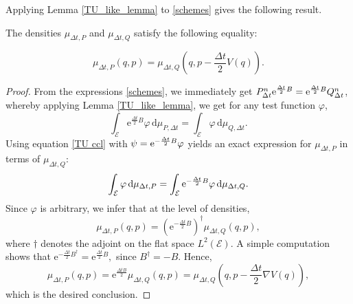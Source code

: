Applying Lemma \ref{TU_like_lemma} to \eqref{schemes} gives the following result.
\begin{prop}\label{prop:mup_expression}
  The densities $\mu_{\Delta t,P}$ and $\mu_{\Delta t,Q}$ satisfy the following equality:

  \begin{equation}
    \label{mu P expression}
    \mu_{\Delta t,P}(q,p) = \mu_{\Delta t,Q}\left(q,p-\frac{\Delta t}2V(q)\right).
  \end{equation}
\end{prop}
\begin{proof}
  From the expressions \eqref{schemes}, we immediately get $P_{\Delta t}^n\mathrm{e}^{\frac{\Delta t}2B}=\mathrm{e}^{\frac{\Delta t}2B}Q_{\Delta t}^n$,
whereby applying Lemma \ref{TU_like_lemma}, we get for any test function $\varphi$,
\begin{equation}
  \label{TU ccl}
  \int_{\mathcal E}\mathrm e^{\frac{\Delta t}2B}\varphi\, \mathrm{d}\mu_{P,\Delta t}=\int_{\mathcal E}\varphi\, \mathrm{d}\mu_{Q,\Delta t}.
\end{equation}
Using equation \eqref{TU ccl} with $\psi=\mathrm{e}^{-\frac{\Delta t}2B}\varphi$ yields an exact expression for $\mu_{\Delta t,P}$ in terms of $\mu_{\Delta t,Q}$:
\begin{equation}
  \label{pi P expression}
  \int_{\mathcal E}\varphi\, \mathrm{d}\mu_{\Delta t,P} = \int_{\mathcal E}\mathrm{e}^{-\frac{\Delta t}2B}\varphi\, \mathrm{d}\mu_{\Delta t,Q}.
\end{equation}
Since $\varphi$ is arbitrary, we infer that at the level of densities,
\begin{equation}
  \mu_{\Delta t,P}(q,p)=\left(\mathrm{e}^{-\frac{\Delta t}2B}\right)^\dagger\mu_{\Delta t,Q}(q,p),
\end{equation}
where $\dagger$ denotes the adjoint on the flat space $L^2(\mathcal E)$. A simple computation shows that 
$\mathrm e^{-\frac{\Delta t}2 B^\dagger}=\mathrm{e}^{\frac{\Delta t}2B},$
since $B^\dagger=-B$.
Hence,
\begin{equation}\label{prop1 ccl}
  \mu_{\Delta t,P}(q,p) = \mathrm{e}^{\frac{\Delta t B}2}\mu_{\Delta t,Q}(q,p)=\mu_{\Delta t,Q}\left(q,p-\frac{\Delta t}2\nabla V(q)\right),
\end{equation}
which is the desired conclusion.
\end{proof}

